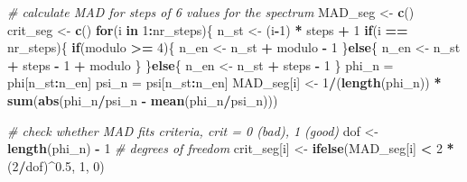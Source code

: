 \documentclass[]{article}
\newenvironment{Shaded}{\begin{snugshade}}{\end{snugshade}}
\newcommand{\KeywordTok}[1]{\textcolor[rgb]{0.13,0.29,0.53}{\textbf{#1}}}
\newcommand{\DecValTok}[1]{\textcolor[rgb]{0.00,0.00,0.81}{#1}}
\newcommand{\FloatTok}[1]{\textcolor[rgb]{0.00,0.00,0.81}{#1}}
\newcommand{\StringTok}[1]{\textcolor[rgb]{0.31,0.60,0.02}{#1}}
\newcommand{\CommentTok}[1]{\textcolor[rgb]{0.56,0.35,0.01}{\textit{#1}}}
\newcommand{\ControlFlowTok}[1]{\textcolor[rgb]{0.13,0.29,0.53}{\textbf{#1}}}
\newcommand{\OperatorTok}[1]{\textcolor[rgb]{0.81,0.36,0.00}{\textbf{#1}}}
\newcommand{\NormalTok}[1]{#1}
\begin{document}
\begin{Shaded}
\begin{Highlighting}[]
{    \CommentTok{# calculate MAD for steps of 6 values for the spectrum}
\NormalTok{    MAD_seg <-}\StringTok{ }\KeywordTok{c}\NormalTok{()}
\NormalTok{    crit_seg <-}\StringTok{ }\KeywordTok{c}\NormalTok{()}
    \ControlFlowTok{for}\NormalTok{(i }\ControlFlowTok{in} \DecValTok{1}\OperatorTok{:}\NormalTok{nr_steps)\{}
\NormalTok{      n_st <-}\StringTok{ }\NormalTok{(i}\OperatorTok{-}\DecValTok{1}\NormalTok{) }\OperatorTok{*}\StringTok{ }\NormalTok{steps }\OperatorTok{+}\StringTok{ }\DecValTok{1}
      \ControlFlowTok{if}\NormalTok{(i }\OperatorTok{==}\StringTok{ }\NormalTok{nr_steps)\{}
        \ControlFlowTok{if}\NormalTok{(modulo }\OperatorTok{>=}\StringTok{ }\DecValTok{4}\NormalTok{)\{}
\NormalTok{          n_en <-}\StringTok{ }\NormalTok{n_st }\OperatorTok{+}\StringTok{ }\NormalTok{modulo }\OperatorTok{-}\StringTok{ }\DecValTok{1}
\NormalTok{        \}}\ControlFlowTok{else}\NormalTok{\{}
\NormalTok{          n_en <-}\StringTok{ }\NormalTok{n_st }\OperatorTok{+}\StringTok{ }\NormalTok{steps }\OperatorTok{-}\StringTok{ }\DecValTok{1} \OperatorTok{+}\StringTok{ }\NormalTok{modulo}
\NormalTok{        \}}
\NormalTok{      \}}\ControlFlowTok{else}\NormalTok{\{}
\NormalTok{        n_en <-}\StringTok{ }\NormalTok{n_st }\OperatorTok{+}\StringTok{ }\NormalTok{steps }\OperatorTok{-}\StringTok{ }\DecValTok{1}
\NormalTok{      \}}
\NormalTok{      phi_n =}\StringTok{ }\NormalTok{phi[n_st}\OperatorTok{:}\NormalTok{n_en]}
\NormalTok{      psi_n =}\StringTok{ }\NormalTok{psi[n_st}\OperatorTok{:}\NormalTok{n_en]}
\NormalTok{      MAD_seg[i] <-}\StringTok{  }\DecValTok{1}\OperatorTok{/}\NormalTok{(}\KeywordTok{length}\NormalTok{(phi_n)) }\OperatorTok{*}\StringTok{ }\KeywordTok{sum}\NormalTok{(}\KeywordTok{abs}\NormalTok{(phi_n}\OperatorTok{/}\NormalTok{psi_n }\OperatorTok{-}\StringTok{ }\KeywordTok{mean}\NormalTok{(phi_n}\OperatorTok{/}\NormalTok{psi_n)))}
    
      \CommentTok{# check whether MAD fits criteria, crit = 0 (bad), 1 (good)}
\NormalTok{      dof <-}\StringTok{ }\KeywordTok{length}\NormalTok{(phi_n) }\OperatorTok{-}\StringTok{ }\DecValTok{1}   \CommentTok{# degrees of freedom}
\NormalTok{      crit_seg[i] <-}\StringTok{ }\KeywordTok{ifelse}\NormalTok{(MAD_seg[i] }\OperatorTok{<}\StringTok{ }\DecValTok{2} \OperatorTok{*}\StringTok{ }\NormalTok{(}\DecValTok{2}\OperatorTok{/}\NormalTok{dof)}\OperatorTok{^}\FloatTok{0.5}\NormalTok{, }\DecValTok{1}\NormalTok{, }\DecValTok{0}\NormalTok{)}
    
}
\end{Highlighting}
\end{Shaded}
\end{document}
